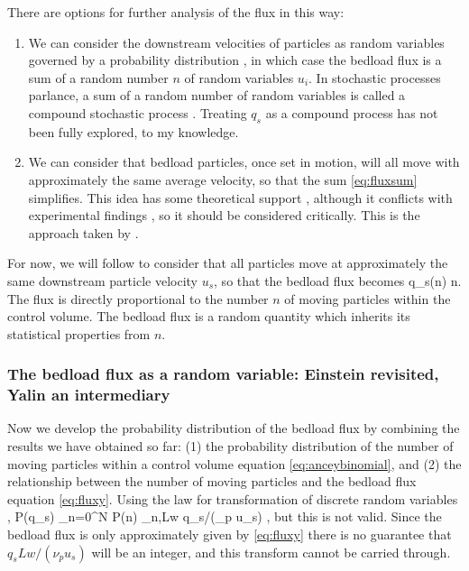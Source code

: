 There are options for further analysis of the flux in this way:  
\begin{enumerate}
\item  We can consider the downstream velocities of particles as random variables governed by a probability distribution \citep{Roseberry2012, Furbish2016}, in which case the bedload flux is a sum of a random number $n$ of random variables $u_i$. 
In stochastic processes parlance, a sum of a random number of random variables is called a compound stochastic process \citep{Feller1968}. 
Treating $q_s$ as a compound process has not been fully explored, to my knowledge. 
 
\item We can consider that bedload particles, once set in motion, will all move with approximately the same average velocity, so that the sum \ref{eq:fluxsum} simplifies.
This idea has some theoretical support \citep[e.g.][]{Ancey2003}, although it conflicts with experimental findings \citep{Heyman2016}, so it should be considered critically.  
This is the approach taken by \citet{Ancey2006}.  
\end{enumerate}

For now, we will follow \citet{Ancey2006} to consider that all particles move at approximately the same downstream particle velocity $u_s$, so that the bedload flux becomes 
\be q_s(n) \approx {} n. \label{eq:fluxy}\ee
The flux is directly proportional to the number $n$ of moving particles within the control volume. 
The bedload flux is a random quantity which inherits its statistical properties from $n$. 

\subsubsection{The bedload flux as a random variable: Einstein revisited, Yalin an intermediary} 

Now we develop the probability distribution of the bedload flux by combining the results we have obtained so far: (1) the probability distribution of the number of moving particles within a control volume equation \ref{eq:anceybinomial}, and (2) the relationship between the number of moving particles and the bedload flux equation \ref{eq:fluxy}. 
Using the law for transformation of discrete random variables \citep[e.g.][]{Feller1968},
\be P(q_s) \approx \sum_{n=0}^N P(n) \delta_{n,Lw q_s/(\nu_p u_s)} ,\label{eq:above}\ee
but this is not valid. 
Since the bedload flux is only approximately given by \ref{eq:fluxy} there is no guarantee that $q_s Lw /(\nu_p u_s)$ will be an integer, and this transform cannot be carried through.  

